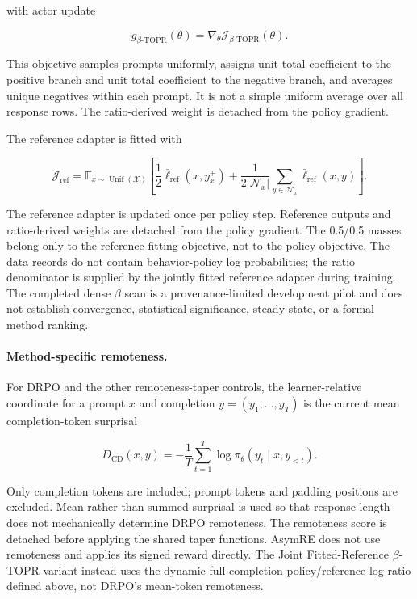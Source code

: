 \documentclass[sigconf,anonymous,review]{acmart}
\theoremstyle{acmdefinition}
\begin{document}
with actor update

\[
g_{\beta\text{-}\mathrm{TOPR}}(\theta)
=
\nabla_\theta\mathcal J_{\beta\text{-}\mathrm{TOPR}}(\theta).
\]

This objective samples prompts uniformly, assigns unit total
coefficient to the positive branch and unit total coefficient to the
negative branch, and averages unique negatives within each prompt. It
is not a simple uniform average over all response rows. The
ratio-derived weight is detached from the policy gradient.

The reference adapter is fitted with

\[
\mathcal J_{\mathrm{ref}}
=
\mathbb E_{x\sim\operatorname{Unif}(\mathcal X)}
\left[
\frac{1}{2}\bar{\ell}_{\mathrm{ref}}(x,y_x^+)
+
\frac{1}{2|\mathcal N_x|}
\sum_{y\in\mathcal N_x}
\bar{\ell}_{\mathrm{ref}}(x,y)
\right].
\]

The reference adapter is updated once per policy step. Reference
outputs and ratio-derived weights are detached from the policy
gradient. The 0.5/0.5 masses belong only to the reference-fitting
objective, not to the policy objective. The data records do not contain
behavior-policy log probabilities; the ratio denominator is supplied by
the jointly fitted reference adapter during training. The completed
dense \(\beta\) scan is a provenance-limited development pilot and does
not establish convergence, statistical significance, steady state, or
a formal method ranking.

\paragraph{Method-specific remoteness.}

For DRPO and the other remoteness-taper controls, the learner-relative
coordinate for a prompt \(x\) and completion
\(y=(y_1,\ldots,y_T)\) is the current mean completion-token surprisal

\[
D_{\mathrm{CD}}(x,y)
=
-\frac{1}{T}
\sum_{t=1}^{T}
\log
\pi_\theta
\left(
y_t\mid x,y_{<t}
\right).
\]

Only completion tokens are included; prompt tokens and padding positions
are excluded. Mean rather than summed surprisal is used so that response
length does not mechanically determine DRPO remoteness. The remoteness
score is detached before applying the shared taper functions. AsymRE
does not use remoteness and applies its signed reward directly. The
Joint Fitted-Reference \(\beta\)-TOPR variant instead uses the dynamic
full-completion policy/reference log-ratio defined above, not DRPO's
mean-token remoteness.
\end{document}

